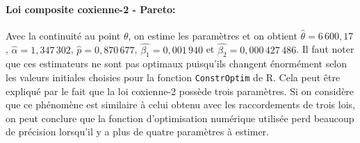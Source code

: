		
		\paragraph{Loi composite coxienne-2 - Pareto:} Avec la continuité au point $\theta$, on estime les paramètres et on obtient $\hat{\theta} =  6\,600,17$, $\hat{\alpha}= 1,347\,302$, $\hat{p} = 0,870\,677$, $\hat{\beta_1}=0,001\,940$ et $\hat{\beta_2}= 0,000\,427\,486$. Il faut noter que ces estimateurs ne sont pas optimaux puisqu'ils changent énormément selon les valeurs initiales choisies pour la fonction \texttt{ConstrOptim} de R. Cela peut être expliqué par le fait que la loi coxienne-2 possède trois paramètres. Si on considère que ce phénomène est similaire à celui obtenu avec les raccordements de trois lois, on peut conclure que la fonction d'optimisation numérique utilisée perd beaucoup de précision lorsqu'il y a plus de quatre paramètres à estimer.
